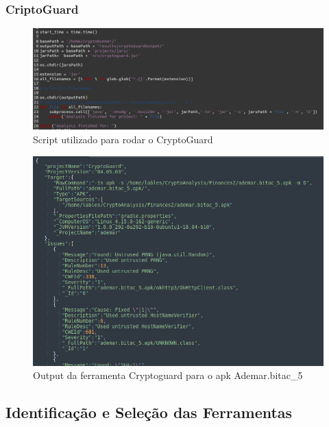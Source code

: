 \FloatBarrier


\subsubsection{CriptoGuard}

\begin{figure}[!ht]
  \centering
  \includegraphics[scale=0.4]{img/cryptoguard_script.png}
  \caption{Script utilizado para rodar o CryptoGuard}
  \label{img: cryptoguard_script}
\end{figure}

\FloatBarrier

\begin{figure}[!ht]
  \centering
  \includegraphics[scale=0.4]{img/cryptoguard_output.png}
  \caption{Output da ferramenta Cryptoguard para o apk Ademar.bitac\_5}
  \label{img: cryptoguard_output}
\end{figure}

\FloatBarrier

\subsection{Identificação e Seleção das Ferramentas} 

